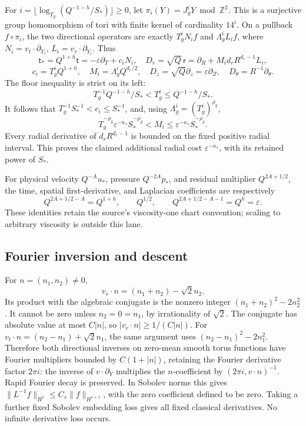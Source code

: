 \documentclass[10pt,a4paper]{article}
\begin{document}
For \(i=\lfloor\log_{T_g}(Q^{-1-h}/S_*)\rfloor\ge0\), let \(\pi_i(Y)=J_g^iY\bmod\mathbb Z^2\). This is a surjective group homomorphism of tori with finite kernel of cardinality \(14^i\). On a pullback \(f\circ\pi_i\), the two directional operators are exactly \(T_g^iN_if\) and \(\Lambda_g^iL_if\), where \(N_i=v_t\cdot\partial_{Y_i}\), \(L_i=v_r\cdot\partial_{Y_i}\). Thus \[
\mathsf t_*=Q^{1+h}\mathsf t=-\varepsilon\partial_T+c_iN_i,
\quad D_r=\sqrt Q\,\mathsf r=\partial_R+M_id_rR^{d_r-1}L_i,
\] \[
c_i=T_g^iQ^{1+h},\quad M_i=\Lambda_g^iQ^{d_r/2},\quad
D_z=\sqrt Q\partial_z=\varepsilon\partial_Z,
\quad D_\theta=R^{-1}\partial_\theta.
\] The floor inequality is strict on its left: \[
T_g^{-1}Q^{-1-h}/S_*<T_g^i\le Q^{-1-h}/S_*.
\] It follows that \(T_g^{-1}S_*^{-1}<c_i\le S_*^{-1}\), and, using \(\Lambda_g^i=(T_g^i)^{\rho_g}\), \[
T_g^{-\rho_g}\varepsilon^{-\kappa_s}S_*^{-\rho_g}
<M_i\le\varepsilon^{-\kappa_s}S_*^{-\rho_g}.
\] Every radial derivative of \(d_rR^{d_r-1}\) is bounded on the fixed positive radial interval. This proves the claimed additional radial cost \(\varepsilon^{-\kappa_s}\), with its retained power of \(S_*\).

For physical velocity \(Q^{-A}u_*\), pressure \(Q^{-2A}p_*\), and residual multiplier \(Q^{2A+1/2}\), the time, spatial first-derivative, and Laplacian coefficients are respectively \[
Q^{2A+1/2-A}=Q^{1+h},\qquad
Q^{1/2},\qquad
Q^{2A+1/2-A-1}=Q^h=\varepsilon.
\] These identities retain the source's viscosity-one chart convention; scaling to arbitrary viscosity is outside this lane.

\subsection{Fourier inversion and descent}\label{fourier-inversion-and-descent}

For \(n=(n_1,n_2)\ne0\), \[
v_r\cdot n=(n_1+n_2)-\sqrt2n_2.
\] Its product with the algebraic conjugate is the nonzero integer \((n_1+n_2)^2-2n_2^2\). It cannot be zero unless \(n_2=0=n_1\), by irrationality of \(\sqrt2\). The conjugate has absolute value at most \(C|n|\), so \(|v_r\cdot n|\ge1/(C|n|)\). For \(v_t\cdot n=(n_2-n_1)+\sqrt2n_1\), the same argument uses \((n_2-n_1)^2-2n_1^2\). Therefore both directional inverses on zero-mean smooth torus functions have Fourier multipliers bounded by \(C(1+|n|)\), retaining the Fourier derivative factor \(2\pi i\): the inverse of \(v\cdot\partial_Y\) multiplies the \(n\)-coefficient by \((2\pi i,v\cdot n)^{-1}\). Rapid Fourier decay is preserved. In Sobolev norms this gives \(\|L^{-1}f\|_{H^s}\le C_s\|f\|_{H^{s+1}}\), with the zero coefficient defined to be zero. Taking a further fixed Sobolev embedding loss gives all fixed classical derivatives. No infinite derivative loss occurs.
\end{document}
